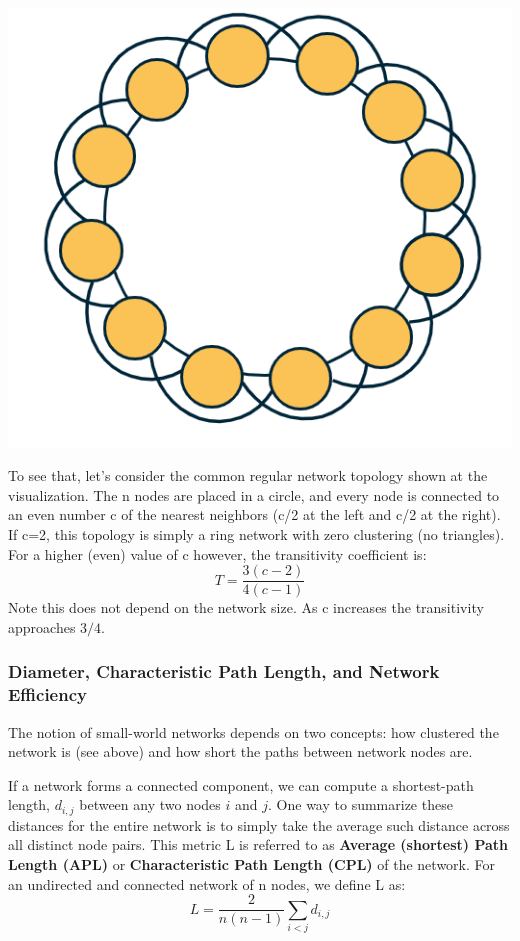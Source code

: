 \documentclass[11pt]{scrartcl} %
\begin{document}
	\begin{center}
		\includegraphics[width=0.75\linewidth]{img/L5.1-RegularNetworkClustering.png}
	\end{center}

To see that, let's consider the common regular network topology shown at the visualization. The n nodes are placed in a circle, and every node is connected to an even number c of the nearest neighbors (c/2 at the left and c/2 at the right). If c=2, this topology is simply a ring network with zero clustering (no triangles). For a higher (even) value of c however, the transitivity coefficient is:
\[ T = \frac{3(c-2)}{4(c-1)} \]
Note this does not depend on the network size. As c increases the transitivity approaches $3/4$.

\subsubsection{Diameter, Characteristic Path Length, and Network Efficiency}
The notion of small-world networks depends on two concepts: how clustered the network is (see above) and how short the paths between network nodes are.

If a network forms a connected component, we can compute a shortest-path length, $d_{i,j}$ between any two nodes $i$ and $j$. One way to summarize these distances for the entire network is to simply take the average such distance across all distinct node pairs. This metric L is referred to as \textbf{Average (shortest) Path Length (APL)} or \textbf{Characteristic Path Length (CPL)} of the network. For an undirected and connected network of n nodes, we define L as:
\[ L = \frac{2}{n(n-1)} \sum_{i<j} d_{i,j} \]
\end{document}

